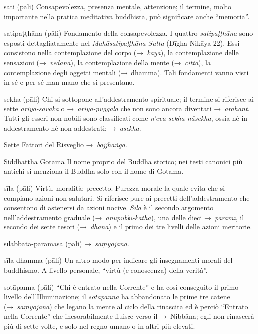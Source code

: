 \begin{glossarydescription}
\item[sati] (pāli) Consapevolezza, presenza mentale, attenzione; il termine,
  molto importante nella pratica meditativa buddhista, può significare anche
  ``memoria''.

\item[satipaṭṭhāna] (pāli)\label{glossary-satipatthana} Fondamento della consapevolezza. I quattro
  \emph{satipaṭṭhāna} sono esposti dettagliatamente nel
  \emph{Mahāsatipaṭṭhāna Sutta} (Dīgha Nikāya 22). Essi consistono
  nella contemplazione del corpo (→~\emph{kāya}), la contemplazione delle
  sensazioni (→~\emph{vedanā}), la contemplazione della mente (→~\emph{citta}),
  la contemplazione degli oggetti mentali (→~dhamma). Tali fondamenti
  vanno visti in sé e per sé man mano che si presentano.

\item[sekha] (pāli) Chi si sottopone all'addestramento spirituale; il termine si
  riferisce ai sette \emph{ariya-sāvaka} o →~\emph{ariya-puggala} che non sono
  ancora diventati →~\emph{arahant}. Tutti gli esseri non nobili sono
  classificati come \emph{n'eva sekha nāsekha}, ossia né in addestramento né non
  addestrati; →~\emph{asekha}.

\item[Sette Fattori del Risveglio] →~\emph{bojjhaṅga}.

\item[Siddhattha Gotama] Il nome proprio del Buddha storico; nei testi canonici
  più antichi si menziona il Buddha solo con il nome di Gotama.

\item[sīla] (pāli) Virtù, moralità; precetto. Purezza morale la quale evita che
  si compiano azioni non salutari. Si riferisce pure ai precetti
  dell'addestramento che consentono di astenersi da azioni nocive. \emph{Sīla} è
  il secondo argomento nell'addestramento graduale (→~\emph{anupubbī-kathā}),
  una delle dieci →~\emph{pāramī}, il secondo dei sette tesori (→~\emph{dhana})
  e il primo dei tre livelli delle azioni meritorie.

\item[sīlabbata-parāmāsa] (pāli) →~\emph{saṃyojana}.

\item[sīla-dhamma] (pāli) Un altro modo per indicare gli insegnamenti morali del
  buddhismo. A livello personale, ``virtù (e conoscenza) della verità''.

\item[sotāpanna] (pāli) ``Chi è entrato nella Corrente'' e ha così conseguito il
  primo livello dell'Illuminazione; il \emph{sotāpanna} ha abbandonato le prime
  tre catene (→~\emph{saṃyojana}) che legano la mente al ciclo della rinascita
  ed è perciò ``Entrato nella Corrente'' che inesorabilmente fluisce verso il
  →~Nibbāna; egli non rinascerà più di sette volte, e solo nel regno
  umano o in altri più elevati.


\end{glossarydescription}

